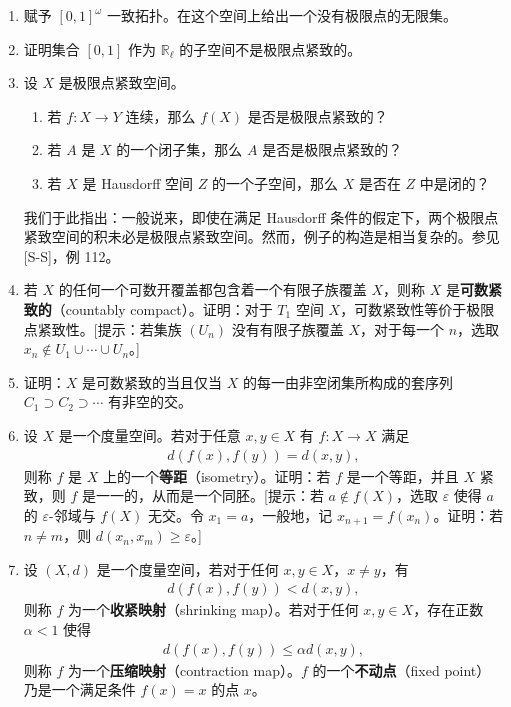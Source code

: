 \begin{enumerate}
\item 赋予 $[0,1]^{\omega}$ 一致拓扑。在这个空间上给出一个没有极限点的无限集。
\item 证明集合 $[0,1]$ 作为 $\mathbb{R}_{\ell}$ 的子空间不是极限点紧致的。
\item 设 $X$ 是极限点紧致空间。
\begin{enumerate}
\item 若 $f\colon X\to Y$ 连续，那么 $f(X)$ 是否是极限点紧致的？
\item 若 $A$ 是 $X$ 的一个闭子集，那么 $A$ 是否是极限点紧致的？
\item 若 $X$ 是 Hausdorff 空间 $Z$ 的一个子空间，那么 $X$ 是否在 $Z$ 中是闭的？
\end{enumerate}
我们于此指出：一般说来，即使在满足 Hausdorff 条件的假定下，两个极限点紧致空间的积未必是极限点紧致空间。然而，例子的构造是相当复杂的。参见 [S-S]，例 112。
\item 若 $X$ 的任何一个可数开覆盖都包含着一个有限子族覆盖 $X$，则称 $X$ 是\textbf{可数紧致的}（countably compact）。证明：对于 $T_{1}$ 空间 $X$，可数紧致性等价于极限点紧致性。[提示：若集族 $(U_{n})$ 没有有限子族覆盖 $X$，对于每一个 $n$，选取 $x_{n}\notin U_{1}\cup\cdots\cup U_{n}$。]
\item 证明：$X$ 是可数紧致的当且仅当 $X$ 的每一由非空闭集所构成的套序列 $C_{1}\supset C_{2}\supset\cdots$ 有非空的交。
\item 设 $X$ 是一个度量空间。若对于任意 $x,y\in X$ 有 $f\colon X\to X$ 满足
\begin{align*}
d(f(x),f(y))=d(x,y),
\end{align*}
则称 $f$ 是 $X$ 上的一个\textbf{等距}（isometry）。证明：若 $f$ 是一个等距，并且 $X$ 紧致，则 $f$ 是一一的，从而是一个同胚。[提示：若 $a\notin f(X)$，选取 $\varepsilon$ 使得 $a$ 的 $\varepsilon$-邻域与 $f(X)$ 无交。令 $x_{1}=a$，一般地，记 $x_{n+1}=f(x_{n})$。证明：若 $n\neq m$，则 $d(x_{n},x_{m})\geqslant\varepsilon$。]
\item 设 $(X,d)$ 是一个度量空间，若对于任何 $x,y\in X$，$x\neq y$，有
\begin{align*}
d(f(x),f(y))<d(x,y),
\end{align*}
则称 $f$ 为一个\textbf{收紧映射}（shrinking map）。若对于任何 $x,y\in X$，存在正数 $\alpha<1$ 使得
\begin{align*}
d(f(x),f(y))\leqslant\alpha d(x,y),
\end{align*}
则称 $f$ 为一个\textbf{压缩映射}（contraction map）。$f$ 的一个\textbf{不动点}（fixed point）乃是一个满足条件 $f(x)=x$ 的点 $x$。

\end{enumerate}
